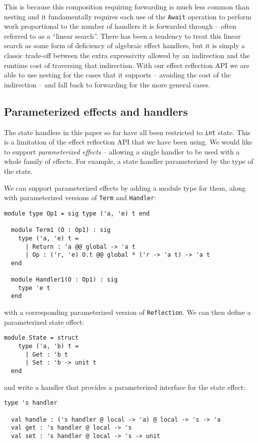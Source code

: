 \documentclass[acmsmall, screen, nonacm]{acmart}
\theoremstyle{definition}
\begin{document}
This is because this composition requiring forwarding is much less
common than nesting and it fundamentally requires each use of the
\lstinline[style=oxcaml]{Await} operation to perform work proportional to
the number of handlers it is forwarded through -- often referred to as a
``linear search''. There has been a tendency to treat this linear search
as some form of deficiency of algebraic effect handlers, but it is
simply a classic trade-off between the extra expressivity allowed by an
indirection and the runtime cost of traversing that indirection. With
our effect reflection API we are able to use nesting for the cases that
it supports -- avoiding the cost of the indirection -- and fall back to
forwarding for the more general cases.

\subsection{Parameterized effects and handlers}

The state handlers in this paper so far have all been restricted to
\lstinline[style=oxcaml]{int} state. This is a limitation of the effect
reflection API that we have been using. We would like to support
\emph{parameterized effects} -- allowing a single handler to be used
with a whole family of effects. For example, a state handler
parameterized by the type of the state.

We can support parameterized effects by adding a module type for them,
along with parameterized versions of \lstinline[style=oxcaml]{Term} and
\lstinline[style=oxcaml]{Handler}:
\begin{lstlisting}[style=oxcaml]
  module type Op1 = sig type ('a, 'e) t end

  module Term1 (O : Op1) : sig
    type ('a, 'e) t =
      | Return : 'a @@ global -> 'a t
      | Op : ('r, 'e) O.t @@ global * ('r -> 'a t) -> 'a t
  end

  module Handler1(O : Op1) : sig
    type 'e t
  end
\end{lstlisting}
with a corresponding parameterized version of
\lstinline[style=oxcaml]{Reflection}. We can then define a parameterized
state effect:
\begin{lstlisting}[style=oxcaml]
  module State = struct
    type ('a, 'b) t =
      | Get : 'b t
      | Set : 'b -> unit t
  end
\end{lstlisting}
and write a handler that provides a parameterized interface for the
state effect:
\begin{lstlisting}[style=oxcaml]
  type 's handler

  val handle : ('s handler @ local -> 'a) @ local -> 's -> 'a
  val get : 's handler @ local -> 's
  val set : 's handler @ local -> 's -> unit
\end{lstlisting}
\end{document}
